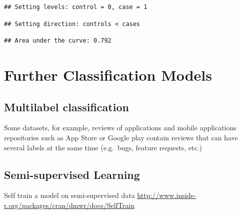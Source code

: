 \documentclass[
]{book}
\newenvironment{Shaded}{\begin{snugshade}}{\end{snugshade}}
\newcommand{\FunctionTok}[1]{\textcolor[rgb]{0.00,0.00,0.00}{#1}}
\newcommand{\NormalTok}[1]{#1}
\newcommand{\SpecialCharTok}[1]{\textcolor[rgb]{0.00,0.00,0.00}{#1}}
\begin{document}
\begin{verbatim}
## Setting levels: control = 0, case = 1
\end{verbatim}

\begin{verbatim}
## Setting direction: controls < cases
\end{verbatim}

\begin{Shaded}
\end{Shaded}

\begin{verbatim}
## Area under the curve: 0.792
\end{verbatim}

\hypertarget{further-classification-models}{%
\chapter{Further Classification Models}\label{further-classification-models}}

\hypertarget{multilabel-classification}{%
\section{Multilabel classification}\label{multilabel-classification}}

Some datasets, for example, reviews of applications and mobile applications repositories such as App Store or Google play contain reviews that can have several labels at the same time (e.g.~bugs, feature requests, etc.)

\hypertarget{semi-supervised-learning}{%
\section{Semi-supervised Learning}\label{semi-supervised-learning}}

Self train a model on semi-supervised data
\url{http://www.inside-r.org/packages/cran/dmwr/docs/SelfTrain}
\end{document}
